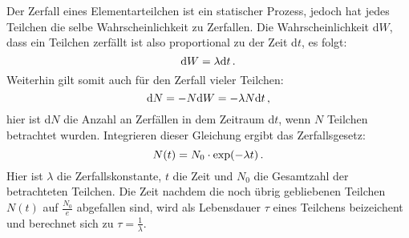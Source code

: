         Der Zerfall eines Elementarteilchen ist ein statischer Prozess, jedoch hat jedes Teilchen die selbe Wahrscheinlichkeit zu Zerfallen.
        Die Wahrscheinlichkeit d$W$, dass ein Teilchen zerfällt ist also proportional zu der Zeit d$t$, es folgt:
        \begin{equation}
            \text{d}W = \lambda\text{d}t \, .
        \end{equation}
        Weiterhin gilt somit auch für den Zerfall vieler Teilchen:
        \begin{equation}
            \text{d}N = -N\text{d}W = -\lambda N \text{d}t \, ,
        \end{equation}
       hier ist d$N$ die Anzahl an Zerfällen in dem Zeitraum d$t$, wenn $N$ Teilchen betrachtet wurden.
       Integrieren dieser Gleichung ergibt das Zerfallsgesetz:
       \begin{equation}
           N(t) = N_0 \cdot \text{exp}(-\lambda t)\, .
       \end{equation}
       Hier ist $\lambda$ die Zerfallskonstante, $t$ die Zeit und $N_0$ die Gesamtzahl der betrachteten Teilchen. 
       Die Zeit nachdem die noch übrig gebliebenen Teilchen $N(t)$ auf $\frac{N_0}{e}$ abgefallen sind, wird als Lebensdauer $\tau$ eines Teilchens beizeichent und berechnet sich zu $\tau = \frac{1}{\lambda}$.





